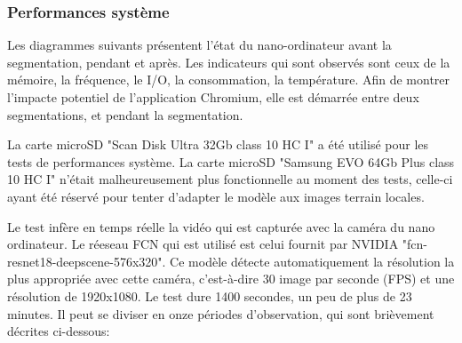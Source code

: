 \subsubsection{Performances système}
\par Les diagrammes suivants présentent l'état du nano-ordinateur avant la segmentation, pendant et après. Les indicateurs qui sont observés sont ceux de la mémoire, la fréquence, le I/O, la consommation, la température. Afin de montrer l'impacte potentiel de l'application Chromium, elle est démarrée entre deux segmentations, et pendant la segmentation. 
\par La carte microSD "Scan Disk Ultra 32Gb class 10 HC I" a été utilisé pour les tests de performances système. La carte microSD "Samsung EVO 64Gb Plus class 10 HC I" n'était malheureusement plus fonctionnelle au moment des tests, celle-ci ayant été réservé pour tenter d'adapter le modèle aux images terrain locales. 
\par Le test infère en temps réelle la vidéo qui est capturée avec la caméra du nano ordinateur. Le réeseau FCN qui est utilisé est celui fournit par NVIDIA "fcn-resnet18-deepscene-576x320". Ce modèle détecte automatiquement la résolution la plus appropriée avec cette caméra, c'est-à-dire 30 image par seconde (FPS) et une résolution de 1920x1080. Le test dure 1400 secondes, un peu de plus de 23 minutes. Il peut se diviser en onze périodes d'observation, qui sont brièvement décrites ci-dessous: 

